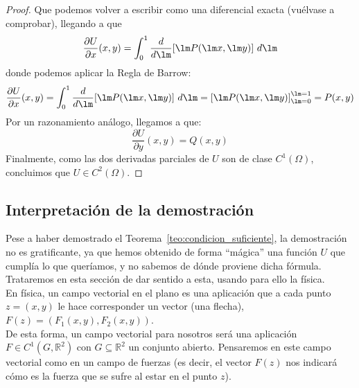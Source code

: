 \begin{teo}
\begin{proof}
        Que podemos volver a escribir como una diferencial exacta (vuélvase a comprobar), llegando a que
        \begin{equation*}
            \dfrac{\partial U}{\partial x}(x,y) = \int_{0}^{1} \dfrac{d}{d\lm}[\lm P(\lm x,\lm y)]~d\lm
        \end{equation*}
        donde podemos aplicar la Regla de Barrow:
        \begin{equation*}
        \dfrac{\partial U}{\partial x}(x,y) = \int_{0}^{1} \dfrac{d}{d\lm}[\lm P(\lm x,\lm y)]~d\lm = {\left[\lm P(\lm x,\lm y)\right]}_{\lm = 0}^{\lm = 1} = P(x,y)
        \end{equation*}
        Por un razonamiento análogo, llegamos a que:
        \begin{equation*}
            \dfrac{\partial U}{\partial y}(x,y) = Q(x,y)
        \end{equation*}
        Finalmente, como las dos derivadas parciales de $U$ son de clase $C^1(\Omega)$, concluimos que $U\in C^2(\Omega)$.
    \end{proof}
\end{teo}

\subsection{Interpretación de la demostración}
Pese a haber demostrado el Teorema~\ref{teo:condicion_suficiente}, la demostración no es gratificante, ya que hemos obtenido de forma ``mágica'' una función $U$ que cumplía lo que queríamos, y no sabemos de dónde proviene dicha fórmula. Trataremos en esta sección de dar sentido a esta, usando para ello la física.\\

\noindent
En física, un campo vectorial en el plano es una aplicación que a cada punto $z=(x,y)$ le hace corresponder un vector (una flecha), $F(z) = (F_1(x,y), F_2(x,y))$.\\

De esta forma, un campo vectorial para nosotros será una aplicación $F\in C^1(G, \mathbb{R}^2)$ con $G\subseteq \mathbb{R}^2$ un conjunto abierto.
Pensaremos en este campo vectorial como en un campo de fuerzas (es decir, el vector $F(z)$ nos indicará cómo es la fuerza que se sufre al estar en el punto $z$).

